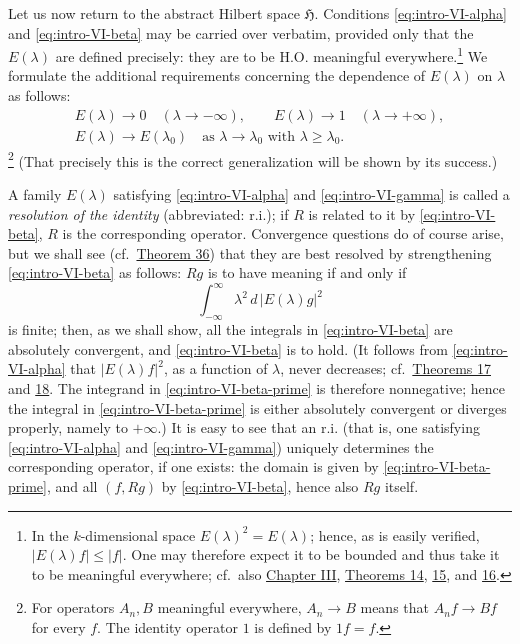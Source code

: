 ﻿\documentclass[paper=b5,fontsize=13pt,bookmarkpackage=false,twoside]{scrartcl}
\begin{document}
Let us now return to the abstract Hilbert space $\mathfrak H$. Conditions \eqref{eq:intro-VI-alpha} and \eqref{eq:intro-VI-beta} may be carried over verbatim, provided only that the $E(\lambda)$ are defined precisely: they are to be H.O. meaningful everywhere.\footnote{\label{fn:source-16}In the $k$-dimensional space $E(\lambda)^2=E(\lambda)$; hence, as is easily verified, $|E(\lambda)f|\le|f|$. One may therefore expect it to be bounded and thus take it to be meaningful everywhere; cf.\ also \hyperref[chap:III]{Chapter III}, \hyperref[thm:14]{Theorems 14}, \hyperref[thm:15]{15}, and \hyperref[thm:16]{16}.} We formulate the additional requirements concerning the dependence of $E(\lambda)$ on $\lambda$ as follows:
\begin{equation}
\begin{gathered}
 E(\lambda)\longrightarrow0\quad(\lambda\to-\infty),
 \qquad
 E(\lambda)\longrightarrow1\quad(\lambda\to+\infty),\\
 E(\lambda)\longrightarrow E(\lambda_0)
 \quad\text{as }\lambda\to\lambda_0\text{ with }\lambda\ge\lambda_0.
\end{gathered}
\tag{$\gamma$}\label{eq:intro-VI-gamma}
\end{equation}
\footnote{\label{fn:source-17}For operators $A_n,B$ meaningful everywhere, $A_n\to B$ means that $A_nf\to Bf$ for every $f$. The identity operator $1$ is defined by $1f=f$.}
(That precisely this is the correct generalization will be shown by its success.)

A family $E(\lambda)$ satisfying \eqref{eq:intro-VI-alpha} and \eqref{eq:intro-VI-gamma} is called a \emph{resolution of the identity} (abbreviated: r.i.); if $R$ is related to it by \eqref{eq:intro-VI-beta}, $R$ is the corresponding operator. Convergence questions do of course arise, but we shall see (cf.\ \hyperref[thm:36]{Theorem 36}) that they are best resolved by strengthening \eqref{eq:intro-VI-beta} as follows: $Rg$ is to have meaning if and only if
\begin{equation}
 \int_{-\infty}^{\infty}\lambda^2\,d\,|E(\lambda)g|^2
 \tag{$\beta'$}\label{eq:intro-VI-beta-prime}
\end{equation}
is finite; then, as we shall show, all the integrals in \eqref{eq:intro-VI-beta} are absolutely convergent, and \eqref{eq:intro-VI-beta} is to hold. (It follows from \eqref{eq:intro-VI-alpha} that $|E(\lambda)f|^2$, as a function of $\lambda$, never decreases; cf.\ \hyperref[thm:17]{Theorems 17} and \hyperref[thm:18]{18}. The integrand in \eqref{eq:intro-VI-beta-prime} is therefore nonnegative; hence the integral in \eqref{eq:intro-VI-beta-prime} is either absolutely convergent or diverges properly, namely to $+\infty$.) It is easy to see that an r.i. (that is, one satisfying \eqref{eq:intro-VI-alpha} and \eqref{eq:intro-VI-gamma}) uniquely determines the corresponding operator, if one exists: the domain is given by \eqref{eq:intro-VI-beta-prime}, and all $(f,Rg)$ by \eqref{eq:intro-VI-beta}, hence also $Rg$ itself.
\end{document}

